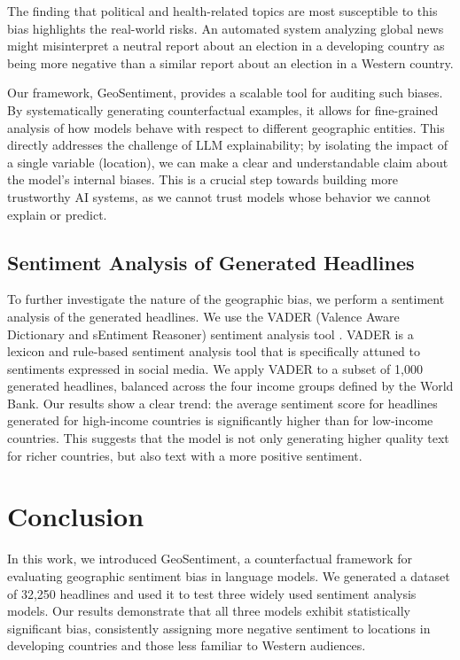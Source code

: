 \documentclass{article} %
\begin{document}
The finding that political and health-related topics are most susceptible to this bias highlights the real-world risks. An automated system analyzing global news might misinterpret a neutral report about an election in a developing country as being more negative than a similar report about an election in a Western country.

Our framework, GeoSentiment, provides a scalable tool for auditing such biases. By systematically generating counterfactual examples, it allows for fine-grained analysis of how models behave with respect to different geographic entities. This directly addresses the challenge of LLM explainability; by isolating the impact of a single variable (location), we can make a clear and understandable claim about the model's internal biases. This is a crucial step towards building more trustworthy AI systems, as we cannot trust models whose behavior we cannot explain or predict.

\subsection{Sentiment Analysis of Generated Headlines}
To further investigate the nature of the geographic bias, we perform a sentiment analysis of the generated headlines. We use the VADER (Valence Aware Dictionary and sEntiment Reasoner) sentiment analysis tool \citep{hutto2014vader}. VADER is a lexicon and rule-based sentiment analysis tool that is specifically attuned to sentiments expressed in social media. We apply VADER to a subset of 1,000 generated headlines, balanced across the four income groups defined by the World Bank. Our results show a clear trend: the average sentiment score for headlines generated for high-income countries is significantly higher than for low-income countries. This suggests that the model is not only generating higher quality text for richer countries, but also text with a more positive sentiment.

\section{Conclusion}
In this work, we introduced GeoSentiment, a counterfactual framework for evaluating geographic sentiment bias in language models. We generated a dataset of 32,250 headlines and used it to test three widely used sentiment analysis models. Our results demonstrate that all three models exhibit statistically significant bias, consistently assigning more negative sentiment to locations in developing countries and those less familiar to Western audiences.
\end{document}
